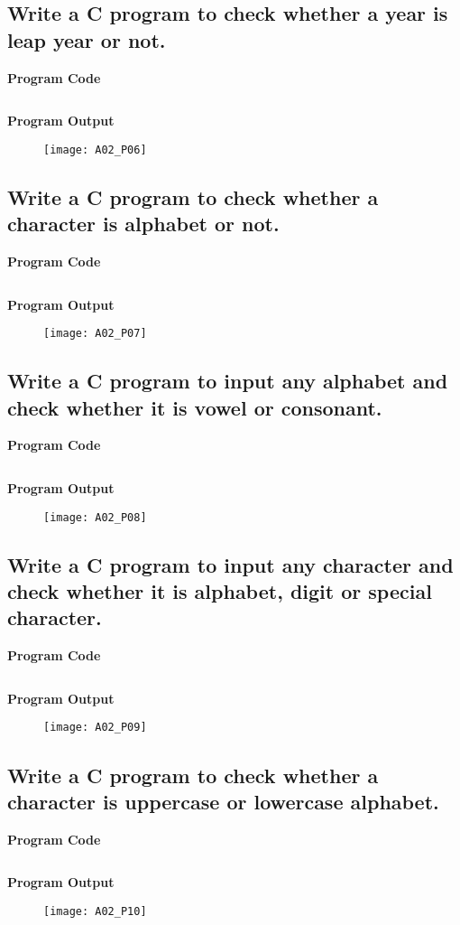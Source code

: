 \subsection{Write a C program to check whether a year is leap year or not.}
\textbf{Program Code}
\inputminted[breaklines]{C}{programs/A02_P06.c}
\textbf{Program Output}
\begin{figure}[h]
  \texttt{[image: A02\_P06]}
\end{figure}
\pagebreak


\subsection{Write a C program to check whether a character is alphabet or not.}
\textbf{Program Code}
\inputminted[breaklines]{C}{programs/A02_P07.c}
\textbf{Program Output}
\begin{figure}[h]
  \texttt{[image: A02\_P07]}
\end{figure}
\pagebreak

\subsection{Write a C program to input any alphabet and check whether it is vowel or consonant.}
\textbf{Program Code}
\inputminted[breaklines]{C}{programs/A02_P08.c}
\textbf{Program Output}
\begin{figure}[h]
  \texttt{[image: A02\_P08]}
\end{figure}
\pagebreak

\subsection{Write a C program to input any character and check whether it is alphabet, digit or special character.}
\textbf{Program Code}
\inputminted[breaklines]{C}{programs/A02_P09.c}
\textbf{Program Output}
\begin{figure}[h]
  \texttt{[image: A02\_P09]}
\end{figure}
\pagebreak

\subsection{Write a C program to check whether a character is uppercase or lowercase alphabet.}
\textbf{Program Code}
\inputminted[breaklines]{C}{programs/A02_P10.c}
\textbf{Program Output}
\begin{figure}[h]
  \texttt{[image: A02\_P10]}
\end{figure}
\pagebreak

